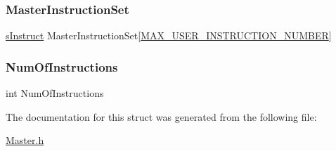 \subsubsection{\texorpdfstring{MasterInstructionSet}{MasterInstructionSet}}
{\footnotesize\ttfamily \mbox{\hyperlink{_s_p_i___instruction_set_8h_a949ec019a0f52780dcdd7d5a5ba73e47}{s\+Instruct}} Master\+Instruction\+Set\mbox{[}\mbox{\hyperlink{_master_8h_a495826fb50dc325303ad65b8a2e2ca8a}{M\+A\+X\+\_\+\+U\+S\+E\+R\+\_\+\+I\+N\+S\+T\+R\+U\+C\+T\+I\+O\+N\+\_\+\+N\+U\+M\+B\+ER}}\mbox{]}}

\mbox{\label{struct_user_instructions_a801574205a73598195471b820f1763be}} 
\subsubsection{\texorpdfstring{NumOfInstructions}{NumOfInstructions}}
{\footnotesize\ttfamily int Num\+Of\+Instructions}



The documentation for this struct was generated from the following file\+:\begin{DoxyCompactItemize}
\item 
\mbox{\hyperlink{_master_8h}{Master.\+h}}\end{DoxyCompactItemize}
